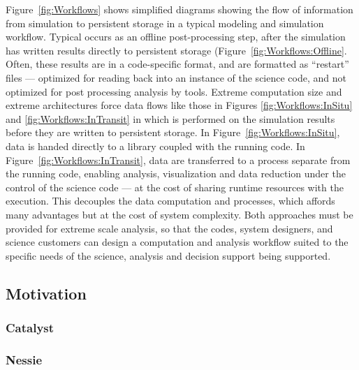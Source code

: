 Figure~\ref{fig:Workflows} shows simplified diagrams showing the flow of
information from simulation to persistent storage in a typical modeling and
simulation workflow.  Typical \vda occurs as an offline post-processing
step, after the simulation has written results directly to persistent
storage (Figure~\ref{fig:Workflows:Offline}.  Often, these results are in a
code-specific format, and are formatted as ``restart'' files --- optimized
for reading back into an instance of the science code, and not optimized
for post processing analysis by \vda tools.  Extreme computation size and
extreme architectures force data flows like those in Figures
\ref{fig:Workflows:InSitu} and \ref{fig:Workflows:InTransit} in which \vda
is performed on the simulation results before they are written to
persistent storage.  In Figure~\ref{fig:Workflows:InSitu}, data is handed
directly to a \vda library coupled with the running code.  In
Figure~\ref{fig:Workflows:InTransit}, data are transferred to a \vda
process separate from the running code, enabling analysis, visualization
and data reduction under the control of the science code --- at the cost of
sharing runtime resources with the \vda execution.  This decouples the data
computation and \vda processes, which affords many advantages but at the
cost of system complexity.  Both approaches must be provided for extreme
scale analysis, so that the codes, system designers, and science customers
can design a computation and analysis workflow suited to the specific needs
of the science, analysis and decision support being supported.

\subsection{Motivation}



\subsubsection{Catalyst}

\subsubsection{Nessie}
